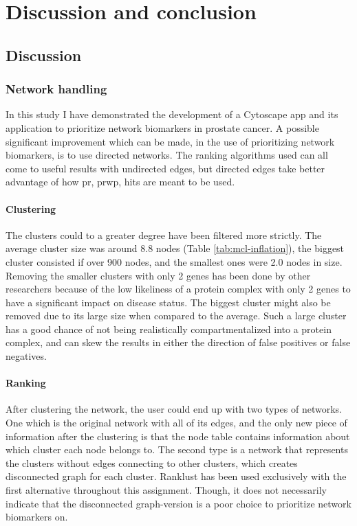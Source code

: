 \part{Discussion and conclusion}
\label{pa:conclusion}
\chapter{Discussion}
\section{Network handling}
In this study I have demonstrated the development of a Cytoscape app and its
application to prioritize network biomarkers in prostate cancer. A possible
significant improvement which can be made, in the use of prioritizing network
biomarkers, is to use directed networks. The ranking algorithms used can all
come to useful results with undirected edges, but directed edges take better
advantage of how \gls{pr}, \gls{prwp}, \gls{hits} are meant to be used.

\subsection{Clustering}
The clusters could to a greater degree have been filtered more strictly. The
average cluster size was around 8.8 nodes (Table \ref{tab:mcl-inflation}), the
biggest cluster consisted if over 900 nodes, and the smallest ones were 2.0 
nodes in size. Removing the smaller clusters with only 2 genes has been done by
other researchers because of the low likeliness of a protein complex with only
2 genes to have a significant impact on disease status. The biggest cluster
might also be removed due to its large size when compared to the average. Such
a large cluster has a good chance of not being realistically compartmentalized
into a protein complex, and can skew the results in either the direction of
false positives or false negatives.

\subsection{Ranking}
After clustering the network, the user could end up with two types of networks.
One which is the original network with all of its edges, and the only new piece
of information after the clustering is that the node table contains information
about which cluster each node belongs to. The second type is a network that
represents the clusters without edges connecting to other clusters, which
creates disconnected graph for each cluster. Ranklust has been used exclusively
with the first alternative throughout this assignment. Though, it does not
necessarily indicate that the disconnected graph-version is a poor choice to
prioritize network biomarkers on.


